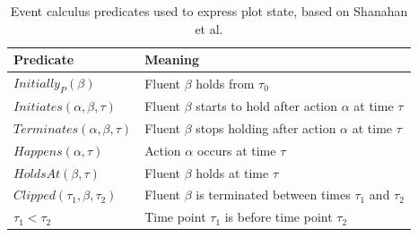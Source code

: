 \begin{table}[]
    \centering
    \begin{tabular}{@{}ll@{}}
        \toprule
        Predicate                                       & Meaning                                                            \\ \midrule
        $Initially_P \left( \beta \right)$              & Fluent $\beta$ holds from $\tau_0$                                 \\
        $Initiates \left( \alpha, \beta, \tau \right)$  & Fluent $\beta$ starts to hold after action $\alpha$ at time $\tau$ \\
        $Terminates \left( \alpha, \beta, \tau \right)$ & Fluent $\beta$ stops holding after action $\alpha$ at time $\tau$  \\
        $Happens \left( \alpha, \tau \right)$           & Action $\alpha$ occurs at time $\tau$                              \\
        $HoldsAt \left( \beta, \tau \right)$            & Fluent $\beta$ holds at time $\tau$                                \\
        $Clipped \left( \tau_1, \beta, \tau_2 \right)$  & Fluent $\beta$ is terminated between times $\tau_1$ and $\tau_2$   \\
        $\tau_1 < \tau_2$                               & Time point $\tau_1$ is before time point $\tau_2$                  \\ \bottomrule
    \end{tabular}
    \caption{Event calculus predicates used to express plot state, based on Shanahan et al.\cite{shanahan2001event}}
    \label{tab:event-calculus-predicates}
\end{table}


